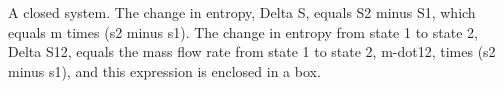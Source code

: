 A closed system. The change in entropy, Delta S, equals S2 minus S1, which equals m times (s2 minus s1). The change in entropy from state 1 to state 2, Delta S12, equals the mass flow rate from state 1 to state 2, m-dot12, times (s2 minus s1), and this expression is enclosed in a box.